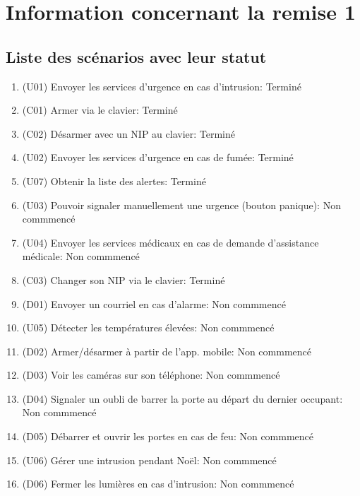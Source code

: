 
\chapter*{Information concernant la remise 1}

\section*{Liste des scénarios avec leur statut}
\begin{enumerate}
	\item (U01) Envoyer les services d'urgence en cas d'intrusion: Terminé
	\item (C01) Armer via le clavier: Terminé
	\item (C02) Désarmer avec un NIP au clavier: Terminé
	\item (U02) Envoyer les services d'urgence en cas de fumée: Terminé
	\item (U07) Obtenir la liste des alertes: Terminé
	\item (U03) Pouvoir signaler manuellement une urgence (bouton panique): Non commmencé
	\item (U04) Envoyer les services médicaux en cas de demande d'assistance médicale: Non commmencé
	\item (C03) Changer son NIP via le clavier: Terminé
	\item (D01) Envoyer un courriel en cas d'alarme: Non commmencé
	\item (U05) Détecter les températures élevées: Non commmencé
	\item (D02) Armer/désarmer à partir de l'app. mobile: Non commmencé
	\item (D03) Voir les caméras sur son téléphone: Non commmencé
	\item (D04) Signaler un oubli de barrer la porte au départ du dernier occupant: Non commmencé
	\item (D05) Débarrer et ouvrir les portes en cas de feu: Non commmencé
	\item (U06) Gérer une intrusion pendant Noël: Non commmencé
	\item (D06) Fermer les lumières en cas d'intrusion: Non commmencé
\end{enumerate}


